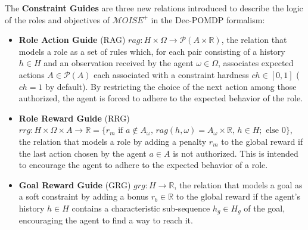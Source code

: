 \documentclass[sigconf,anonymous]{aamas}
\begin{document}
The \textbf{Constraint Guides} \quad are three new relations introduced to describe the logic of the roles and objectives of $\mathcal{M}OISE^+$ in the Dec-POMDP formalism:

\begin{itemize}
    \item \textbf{Role Action Guide} (RAG) \quad $rag: H \times \Omega \rightarrow \mathcal{P}(A \times \mathbb{R})$, the relation that models a role as a set of rules which, for each pair consisting of a history $h \in H$ and an observation received by the agent $\omega \in \Omega$, associates expected actions $A \in \mathcal{P}(A)$ each associated with a constraint hardness $ch \in [0,1]$ ($ch = 1$ by default). By restricting the choice of the next action among those authorized, the agent is forced to adhere to the expected behavior of the role.
    \item \textbf{Role Reward Guide} (RRG) \quad $rrg: H \times \Omega \times A \to \mathbb{R} = \{r_m \text{ if } a \notin A_\omega \text{, } rag(h, \omega) = A_\omega \times \mathbb{R} \text{, } h \in H; \text{ else } 0\}$, the relation that models a role by adding a penalty $r_m$ to the global reward if the last action chosen by the agent $a \in A$ is not authorized. This is intended to encourage the agent to adhere to the expected behavior of a role.
    \item \textbf{Goal Reward Guide} (GRG) \quad $grg: H \rightarrow \mathbb{R}$, the relation that models a goal as a soft constraint by adding a bonus $r_b \in \mathbb{R}$ to the global reward if the agent's history $h \in H$ contains a characteristic sub-sequence $h_g \in H_g$ of the goal, encouraging the agent to find a way to reach it.
\end{itemize}

\end{document}
